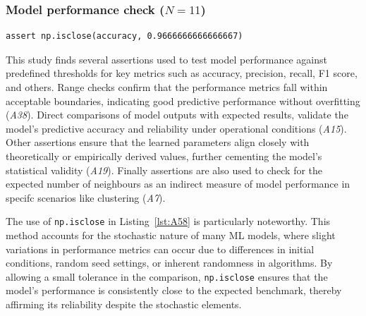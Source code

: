 \subsubsection{Model performance check ($N = 11$)}\label{sec:assert-model-perf}

\begin{lstlisting}[caption={Assertion \emph{A58} used to check that the accuracy of a model is close to the specified value. The use of \lstinline{np.isclose} allows for small deviations in the accuracy thus accounting for the stocastic nature of ML models.}, label={lst:A58}]
assert np.isclose(accuracy, 0.9666666666666667)
\end{lstlisting}

This study finds several assertions used to test model performance against predefined thresholds for key metrics such as accuracy, precision, recall, F1 score, and others. Range checks confirm that the performance metrics fall within acceptable boundaries, indicating good predictive performance without overfitting (\emph{A38}). Direct comparisons of model outputs with expected results, validate the model's predictive accuracy and reliability under operational conditions (\emph{A15}). Other assertions ensure that the learned parameters align closely with theoretically or empirically derived values, further cementing the model’s statistical validity (\emph{A19}). Finally assertions are also used to check for the expected number of neighbours as an indirect measure of model performance in specifc scenarios like clustering (\emph{A7}).

The use of \lstinline{np.isclose} in Listing~\ref{lst:A58} is particularly noteworthy. This method accounts for the stochastic nature of many ML models, where slight variations in performance metrics can occur due to differences in initial conditions, random seed settings, or inherent randomness in algorithms. By allowing a small tolerance in the comparison, \lstinline{np.isclose} ensures that the model's performance is consistently close to the expected benchmark, thereby affirming its reliability despite the stochastic elements.


